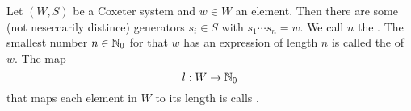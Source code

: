 \begin{defi}
	\label{length-function}
	Let $(W,S)$ be a Coxeter system and $w \in W$ an element. Then there are some (not neseccarily distince) generators $s_i \in S$ with $s_1 \cdots s_n = w$. We call $n$ the . The smallest number $n \in \mathbb{N}_0$ for that $w$ has an expression of length $n$ is called the  of $w$. The map
	$$ l : W \to \mathbb{N}_0 $$
	that maps each element in $W$ to its length is calls .
\end{defi}